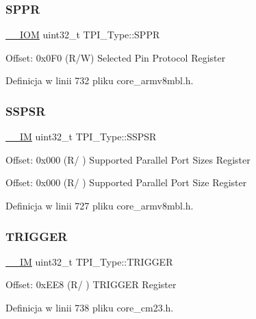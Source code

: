 \subsubsection{\texorpdfstring{S\+P\+PR}{SPPR}}
{\footnotesize\ttfamily \hyperlink{core__sc300_8h_ab6caba5853a60a17e8e04499b52bf691}{\+\_\+\+\_\+\+I\+OM} uint32\+\_\+t T\+P\+I\+\_\+\+Type\+::\+S\+P\+PR}

Offset\+: 0x0\+F0 (R/W) Selected Pin Protocol Register 

Definicja w linii 732 pliku core\+\_\+armv8mbl.\+h.

\mbox{\label{struct_t_p_i___type_a037901d7cb870199ac51d9ad0ef9fd1a}} 
\subsubsection{\texorpdfstring{S\+S\+P\+SR}{SSPSR}}
{\footnotesize\ttfamily \hyperlink{core__sc300_8h_a4cc1649793116d7c2d8afce7a4ffce43}{\+\_\+\+\_\+\+IM} uint32\+\_\+t T\+P\+I\+\_\+\+Type\+::\+S\+S\+P\+SR}

Offset\+: 0x000 (R/ ) Supported Parallel Port Sizes Register

Offset\+: 0x000 (R/ ) Supported Parallel Port Size Register 

Definicja w linii 727 pliku core\+\_\+armv8mbl.\+h.

\mbox{\label{struct_t_p_i___type_a4d4cd2357f72333a82a1313228287bbd}} 
\subsubsection{\texorpdfstring{T\+R\+I\+G\+G\+ER}{TRIGGER}}
{\footnotesize\ttfamily \hyperlink{core__sc300_8h_a4cc1649793116d7c2d8afce7a4ffce43}{\+\_\+\+\_\+\+IM} uint32\+\_\+t T\+P\+I\+\_\+\+Type\+::\+T\+R\+I\+G\+G\+ER}

Offset\+: 0x\+E\+E8 (R/ ) T\+R\+I\+G\+G\+ER Register 

Definicja w linii 738 pliku core\+\_\+cm23.\+h.

\mbox{\label{struct_t_p_i___type_a01972f64f408cec28320780ca067b142}} 
